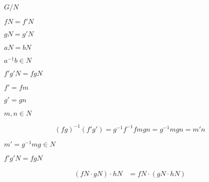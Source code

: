 \documentclass[10pt]{book}
\begin{document}
\begin{mdSnippets}
\begin{mdInlineSnippet}[aa264a8ce114f1e86dda79b1f6205717]
$G/N$\end{mdInlineSnippet}%
\begin{mdInlineSnippet}[eabbf1d6a7735b6885b6815491c61c55]%
$fN = f'N$\end{mdInlineSnippet}%
\begin{mdInlineSnippet}[689af3f5d86456a9fcd70357e5ea1167]%
$gN = g'N$\end{mdInlineSnippet}%
\begin{mdInlineSnippet}[a9c0445d2196f015a192d2779b368d18]%
$aN = bN$\end{mdInlineSnippet}%
\begin{mdInlineSnippet}[c1f096b283e3d932c7dcb1d489729725]%
$a^{-1}b \in N$\end{mdInlineSnippet}%
\begin{mdInlineSnippet}[53c912aa99a353c7001f2dfeaa77bb58]%
$f'g'N = fgN$\end{mdInlineSnippet}%
\begin{mdInlineSnippet}[2356cff6714f6398849c6475b1f423fd]%
$f' = fm$\end{mdInlineSnippet}%
\begin{mdInlineSnippet}%
$g' = gn$\end{mdInlineSnippet}%
\begin{mdInlineSnippet}%
$m,n \in N$\end{mdInlineSnippet}%
\begin{mdDisplaySnippet}[df184c0dfffcf7730c625743090fd6f2]%
\[%
(fg)^{-1}(f'g') = g^{-1} f^{-1} fm gn = g^{-1} mgn = m'n
\]%
\end{mdDisplaySnippet}%
\begin{mdInlineSnippet}%
$m' = g^{-1} mg \in N$\end{mdInlineSnippet}%
\begin{mdInlineSnippet}[53c912aa99a353c7001f2dfeaa77bb58]%
$f'g'N = fgN$\end{mdInlineSnippet}%
\begin{mdDisplaySnippet}[26a03d9e65a2b8d6aaa26cf4aa9944a4]%
\[%
\begin{aligned}
(fN \cdot gN) \cdot hN &= fN \cdot (gN \cdot hN) \\

\end{aligned}\]
\end{mdDisplaySnippet}
\end{mdSnippets}
\end{document}
